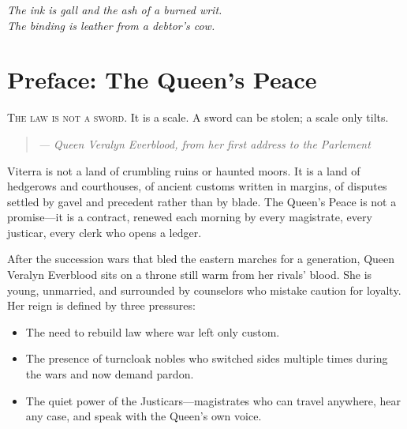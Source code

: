 \documentclass[11pt,twoside]{book}
\newenvironment{quotebox}
{\begin{quote}\small\itshape}
{\end{quote}}
\begin{document}


\frontmatter



\thispagestyle{empty}
\begin{center}
\vspace*{2em}
\textit{The ink is gall and the ash of a burned writ.}\\
\textit{The binding is leather from a debtor's cow.}
\vspace{2em}
\end{center}

\tableofcontents

\mainmatter

\chapter[Preface: The Queen's Peace]{Preface: The Queen's Peace}

\lettrine[lines=3,findent=2pt]{T}{he law is not a sword.} It is a scale. A sword can be stolen; a scale only tilts.

\begin{quotebox}
--- Queen Veralyn Everblood, from her first address to the Parlement
\end{quotebox}

Viterra is not a land of crumbling ruins or haunted moors. It is a land of hedgerows and courthouses, of ancient customs written in margins, of disputes settled by gavel and precedent rather than by blade. The Queen's Peace is not a promise---it is a contract, renewed each morning by every magistrate, every justicar, every clerk who opens a ledger.

After the succession wars that bled the eastern marches for a generation, Queen Veralyn Everblood sits on a throne still warm from her rivals' blood. She is young, unmarried, and surrounded by counselors who mistake caution for loyalty. Her reign is defined by three pressures:

\begin{itemize}
    \item The need to rebuild law where war left only custom.
    \item The presence of turncloak nobles who switched sides multiple times during the wars and now demand pardon.
    \item The quiet power of the Justicars---magistrates who can travel anywhere, hear any case, and speak with the Queen's own voice.
\end{itemize}
\end{document}
